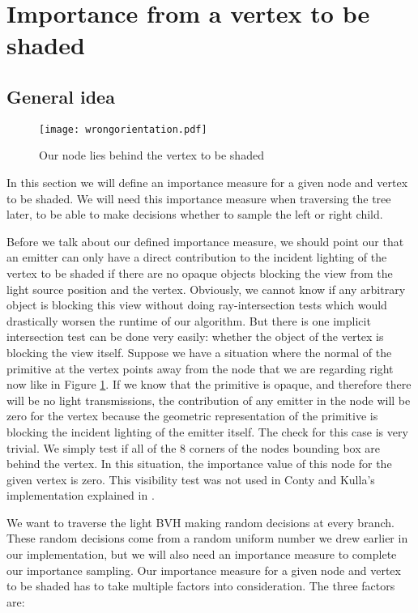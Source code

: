 \section{Importance from a vertex to be shaded}
\label{sec:imp}

\subsection{General idea}

\begin{figure}
	\begin{center}
		\texttt{[image: wrongorientation.pdf]}
		\caption{Our node lies behind the vertex to be shaded}
		\label{fig:wrongorientation}
	\end{center}
\end{figure}

In this section we will define an importance measure for a given node and vertex to be shaded. We will need this importance measure when traversing the tree later, to be able to make decisions whether to sample the left or right child.

Before we talk about our defined importance measure, we should point our that an emitter can only have a direct contribution to the incident lighting of the vertex to be shaded if there are no opaque objects blocking the view from the light source position and the vertex. Obviously, we cannot know if any arbitrary object is blocking this view without doing ray-intersection tests which would drastically worsen the runtime of our algorithm. But there is one implicit intersection test can be done very easily: whether the object of the vertex is blocking the view itself. Suppose we have a situation where the normal of the primitive at the vertex points away from the node that we are regarding right now like in Figure \ref{fig:wrongorientation}. If we know that the primitive is opaque, and therefore there will be no light transmissions, the contribution of any emitter in the node will be zero for the vertex because the geometric representation of the primitive is blocking the incident lighting of the emitter itself. The check for this case is very trivial. We simply test if all of the 8 corners of the nodes bounding box are behind the vertex. In this situation, the importance value of this node for the given vertex is zero. This visibility test was not used in Conty and Kulla's implementation explained in \cite{MLA,MLS}.

We want to traverse the light BVH making random decisions at every branch. These random decisions come from a random uniform number we drew earlier in our implementation, but we will also need an importance measure to complete our importance sampling. Our importance measure for a given node and vertex to be shaded has to take multiple factors into consideration. The three factors are:

